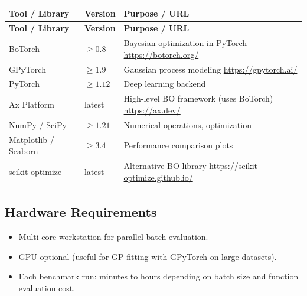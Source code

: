 \documentclass[11pt,a4paper]{article}
\begin{document}
\begin{longtable}{p{4.5cm} p{2.5cm} p{6.5cm}}
\toprule
\textbf{Tool / Library} & \textbf{Version} & \textbf{Purpose / URL} \\
\midrule
\endfirsthead
\toprule
\textbf{Tool / Library} & \textbf{Version} & \textbf{Purpose / URL} \\
\midrule
\endhead
BoTorch & $\geq 0.8$ & Bayesian optimization in PyTorch \newline \url{https://botorch.org/} \\
\midrule
GPyTorch & $\geq 1.9$ & Gaussian process modeling \newline \url{https://gpytorch.ai/} \\
\midrule
PyTorch & $\geq 1.12$ & Deep learning backend \\
\midrule
Ax Platform & latest & High-level BO framework (uses BoTorch) \newline \url{https://ax.dev/} \\
\midrule
NumPy / SciPy & $\geq 1.21$ & Numerical operations, optimization \\
\midrule
Matplotlib / Seaborn & $\geq 3.4$ & Performance comparison plots \\
\midrule
scikit-optimize & latest & Alternative BO library \newline \url{https://scikit-optimize.github.io/} \\
\bottomrule
\end{longtable}

\subsection{Hardware Requirements}
\begin{itemize}
  \item Multi-core workstation for parallel batch evaluation.
  \item GPU optional (useful for GP fitting with GPyTorch on large datasets).
  \item Each benchmark run: minutes to hours depending on batch size and function evaluation cost.
\end{itemize}
\end{document}
